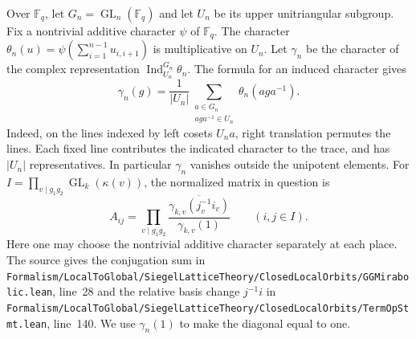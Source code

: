 \documentclass[a4paper,11pt]{article}
\theoremstyle{definition}
\theoremstyle{remark}
\newcommand{\srcloc}[2]{{\small\nolinkurl{#1.lean}}, line~#2}
\numberwithin{equation}{section}
\newcommand{\GL}{\operatorname{GL}}
\begin{document}
Over \(\mathbb F_q\), let \(G_n=\GL_n(\mathbb F_q)\) and let \(U_n\)
be its upper unitriangular subgroup. Fix a nontrivial additive
character \(\psi\) of \(\mathbb F_q\). The character
\(\theta_n(u)=\psi(\sum_{i=1}^{n-1}u_{i,i+1})\) is multiplicative
on \(U_n\). Let \(\gamma_n\) be the character of the complex
representation \(\operatorname{Ind}_{U_n}^{G_n}\theta_n\).
The formula for an induced character gives
\begin{equation}
 \gamma_n(g)=\frac{1}{|U_n|}
 \sum_{\substack{a\in G_n\\aga^{-1}\in U_n}}\theta_n(aga^{-1}).
 \label{eq:ind125}
\end{equation}
Indeed, on the lines indexed by left cosets \(U_n a\), right
translation permutes the lines. Each fixed line contributes the
indicated character to the trace, and has \(|U_n|\) representatives.
In particular \(\gamma_n\) vanishes outside the unipotent elements.
For \(I=\prod_{v\mid g_1g_2}\GL_k(\kappa(v))\), the normalized
matrix in question is
\begin{equation}
 A_{ij}=\prod_{v\mid g_1g_2}
 \frac{\overline{\gamma_{k,v}(j_v^{-1}i_v)}}{\gamma_{k,v}(1)}
 \qquad(i,j\in I).
 \label{eq:actual125}
\end{equation}
Here one may choose the nontrivial additive character separately at
each place. The source gives the conjugation sum in
\srcloc{Formalism/LocalToGlobal/SiegelLatticeTheory/ClosedLocalOrbits/GGMirabolic}{28}
and the relative basis change \(j^{-1}i\) in
\srcloc{Formalism/LocalToGlobal/SiegelLatticeTheory/ClosedLocalOrbits/TermOpStmt}{140}.
We use \(\gamma_n(1)\) to make the diagonal equal to one.
\end{document}
